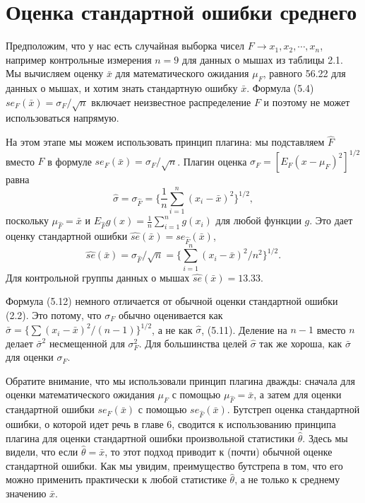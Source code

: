 \section{Оценка стандартной ошибки среднего}

Предположим, что у нас есть случайная выборка чисел $F \rightarrow x_1, x_2, \cdots, x_n$, например контрольные измерения $n = 9$ для данных о мышах из таблицы 2.1. Мы вычисляем оценку $\bar x$ для математического ожидания $\mu_F$, равного 56.22 для данных о мышах, и хотим знать стандартную ошибку $\bar x$. Формула (5.4) $se_F (\bar x) = \sigma_F/\sqrt{n}$ включает неизвестное распределение $F$ и поэтому не может использоваться напрямую. 

На этом этапе мы можем использовать принцип плагина: мы подставляем $\hat F$ вместо $F$ в формуле $se_F (\bar x) = \sigma_F/\sqrt{n}$. Плагин оценка $\sigma_F = [E_F (x- \mu_F)^2]^{1/2}$ равна
\begin{equation}
    \hat\sigma=\sigma_{\hat F}=\{\frac{1}{n}\sum_{i=1}^n(x_i-\bar x)^2\}^{1/2},
\end{equation}
поскольку $\mu_{\hat F}= \bar x$ и $E_{\hat F}g (x) = \frac{1}{n}\sum_{i=1}^n g (x_i)$ для любой функции $g$. Это дает оценку стандартной ошибки $\widehat{se} (\bar x) = se_{\hat F} (\bar x)$, 
\begin{equation}
    \widehat{se} (\bar x) = \sigma_{\hat F}/\sqrt{n}=\{\sum_{i=1}^n(x_i-\bar x)^2/n^2\}^{1/2}.
\end{equation}
Для контрольной группы данных о мышах $\widehat{se} (\bar x) = 13.33$.

Формула (5.12) немного отличается от обычной оценки стандартной ошибки (2.2). Это потому, что $\sigma_F$ обычно оценивается как $\bar\sigma=\{\sum(x_i-\bar x)^2/(n-1)\}^{1/2}$, а не как $\hat\sigma$, (5.11). Деление на $n - 1$ вместо $n$ делает $\bar\sigma^2$ несмещенной для $\sigma_F^2$. Для большинства целей $\hat\sigma$ так же хороша, как $\bar\sigma$ для оценки $\sigma_F$. 

Обратите внимание, что мы использовали принцип плагина дважды: сначала для оценки математического ожидания $\mu_F$ с помощью $\mu_{\hat F} = \bar x$, а затем для оценки стандартной ошибки $se_F (\bar x)$ с помощью $se_{\hat F} (\bar x)$. Бутстреп оценка стандартной ошибки, о которой идет речь в главе 6, сводится к использованию принципа плагина для оценки стандартной ошибки произвольной статистики $\hat\theta$. Здесь мы видели, что если $\hat\theta = \bar x$, то этот подход приводит к (почти) обычной оценке стандартной ошибки. Как мы увидим, преимущество бутстрепа в том, что его можно применить практически к любой статистике $\hat\theta$, а не только к среднему значению $\bar x$. 